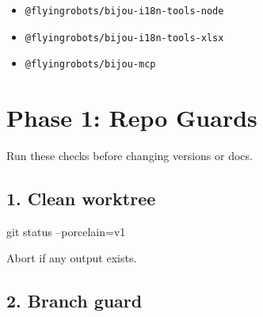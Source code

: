 \begin{itemize}
\item
  \texttt{@\allowbreak{}f\allowbreak{}l\allowbreak{}y\allowbreak{}i\allowbreak{}n\allowbreak{}g\allowbreak{}r\allowbreak{}o\allowbreak{}b\allowbreak{}o\allowbreak{}t\allowbreak{}s\allowbreak{}/\allowbreak{}b\allowbreak{}i\allowbreak{}j\allowbreak{}o\allowbreak{}u\allowbreak{}-\allowbreak{}i\allowbreak{}1\allowbreak{}8\allowbreak{}n\allowbreak{}-\allowbreak{}t\allowbreak{}o\allowbreak{}o\allowbreak{}l\allowbreak{}s\allowbreak{}-\allowbreak{}n\allowbreak{}o\allowbreak{}d\allowbreak{}e}
\item
  \texttt{@\allowbreak{}f\allowbreak{}l\allowbreak{}y\allowbreak{}i\allowbreak{}n\allowbreak{}g\allowbreak{}r\allowbreak{}o\allowbreak{}b\allowbreak{}o\allowbreak{}t\allowbreak{}s\allowbreak{}/\allowbreak{}b\allowbreak{}i\allowbreak{}j\allowbreak{}o\allowbreak{}u\allowbreak{}-\allowbreak{}i\allowbreak{}1\allowbreak{}8\allowbreak{}n\allowbreak{}-\allowbreak{}t\allowbreak{}o\allowbreak{}o\allowbreak{}l\allowbreak{}s\allowbreak{}-\allowbreak{}x\allowbreak{}l\allowbreak{}s\allowbreak{}x}
\item
  \texttt{@\allowbreak{}f\allowbreak{}l\allowbreak{}y\allowbreak{}i\allowbreak{}n\allowbreak{}g\allowbreak{}r\allowbreak{}o\allowbreak{}b\allowbreak{}o\allowbreak{}t\allowbreak{}s\allowbreak{}/\allowbreak{}b\allowbreak{}i\allowbreak{}j\allowbreak{}o\allowbreak{}u\allowbreak{}-\allowbreak{}m\allowbreak{}c\allowbreak{}p}
\end{itemize}

\section{Phase 1: Repo Guards}\label{record-274-phase-1-repo-guards}

Run these checks before changing versions or docs.

\subsection{1. Clean worktree}\label{record-274-clean-worktree}

\begin{CodeBlock}
git status --porcelain=v1
\end{CodeBlock}

Abort if any output exists.

\subsection{2. Branch guard}\label{record-274-branch-guard}

